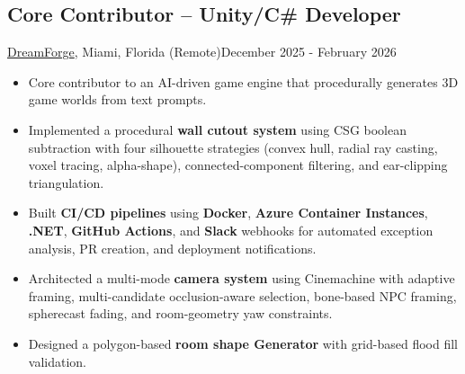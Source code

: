 \subsection{Core Contributor -- Unity/C\# Developer}{\href{https://www.playdreamforge.com/}{DreamForge}, Miami, Florida (Remote)}{December 2025 - February 2026}
\begin{itemize}
    \item Core contributor to an AI-driven game engine that procedurally generates 3D game worlds from text prompts.
    \item Implemented a procedural \textbf{wall cutout system} using CSG boolean subtraction with four silhouette strategies (convex hull, radial ray casting, voxel tracing, alpha-shape), connected-component filtering, and ear-clipping triangulation.
    \item Built \textbf{CI/CD pipelines} using \textbf{Docker}, \textbf{Azure Container Instances}, \textbf{.NET}, \textbf{GitHub Actions}, and \textbf{Slack} webhooks for automated exception analysis, PR creation, and deployment notifications.
    \item Architected a multi-mode \textbf{camera system} using Cinemachine with adaptive framing, multi-candidate occlusion-aware selection, bone-based NPC framing, spherecast fading, and room-geometry yaw constraints.
    \item Designed a polygon-based \textbf{room shape Generator} with grid-based flood fill validation.

\end{itemize}
